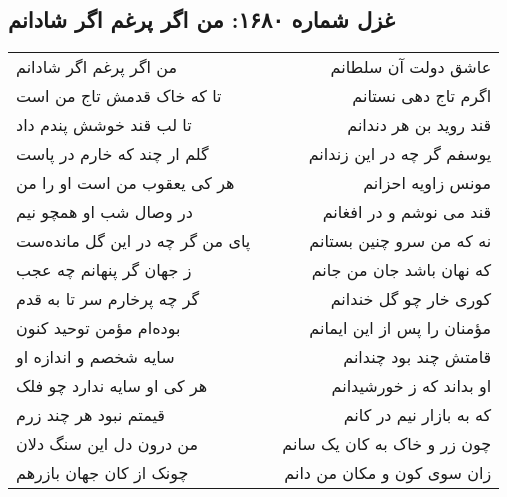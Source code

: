 \begin{center}
\section*{غزل شماره ۱۶۸۰: من اگر پرغم اگر شادانم}
\label{sec:1680}
\begin{longtable}{l p{0.5cm} r}
من اگر پرغم اگر شادانم
&&
عاشق دولت آن سلطانم
\\
تا که خاک قدمش تاج من است
&&
اگرم تاج دهی نستانم
\\
تا لب قند خوشش پندم داد
&&
قند روید بن هر دندانم
\\
گلم ار چند که خارم در پاست
&&
یوسفم گر چه در این زندانم
\\
هر کی یعقوب من است او را من
&&
مونس زاویه احزانم
\\
در وصال شب او همچو نیم
&&
قند می نوشم و در افغانم
\\
پای من گر چه در این گل مانده‌ست
&&
نه که من سرو چنین بستانم
\\
ز جهان گر پنهانم چه عجب
&&
که نهان باشد جان من جانم
\\
گر چه پرخارم سر تا به قدم
&&
کوری خار چو گل خندانم
\\
بوده‌ام مؤمن توحید کنون
&&
مؤمنان را پس از این ایمانم
\\
سایه شخصم و اندازه او
&&
قامتش چند بود چندانم
\\
هر کی او سایه ندارد چو فلک
&&
او بداند که ز خورشیدانم
\\
قیمتم نبود هر چند زرم
&&
که به بازار نیم در کانم
\\
من درون دل این سنگ دلان
&&
چون زر و خاک به کان یک سانم
\\
چونک از کان جهان بازرهم
&&
زان سوی کون و مکان من دانم
\\
\end{longtable}
\end{center}

